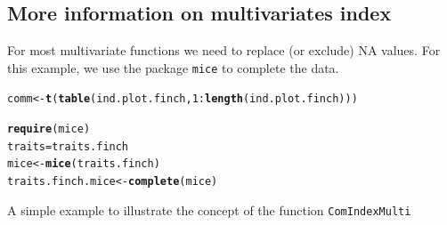 \documentclass[12pt]{article}\usepackage[]{graphicx}\usepackage[]{color}
\makeatletter
\newcommand{\hlnum}[1]{\textcolor[rgb]{0.686,0.059,0.569}{#1}}%
\newcommand{\hlopt}[1]{\textcolor[rgb]{0,0,0}{#1}}%
\newcommand{\hlstd}[1]{\textcolor[rgb]{0.345,0.345,0.345}{#1}}%
\newcommand{\hlkwb}[1]{\textcolor[rgb]{0.69,0.353,0.396}{#1}}%
\newcommand{\hlkwd}[1]{\textcolor[rgb]{0.737,0.353,0.396}{\textbf{#1}}}%
\newenvironment{kframe}{%
 \def\at@end@of@kframe{}%
 \ifinner\ifhmode%
  \def\at@end@of@kframe{\end{minipage}}%
  \begin{minipage}{\columnwidth}%
 \fi\fi%
 \def\FrameCommand##1{\hskip\@totalleftmargin \hskip-\fboxsep
 \colorbox{shadecolor}{##1}\hskip-\fboxsep
     \hskip-\linewidth \hskip-\@totalleftmargin \hskip\columnwidth}%
 \MakeFramed {\advance\hsize-\width
   \@totalleftmargin\z@ \linewidth\hsize
   \@setminipage}}%
 {\par\unskip\endMakeFramed%
 \at@end@of@kframe}
\newenvironment{knitrout}{}{} %
\makeatother
\begin{document}
\newpage

\subsection{More information on multivariates index}

For most multivariate functions we need to replace (or exclude) NA values. For this example, we use the package \texttt{mice} to complete the data.

\begin{knitrout}
\color{fgcolor}\begin{kframe}
\begin{alltt}
\hlstd{comm}\hlkwb{<-}\hlkwd{t}\hlstd{(}\hlkwd{table}\hlstd{(ind.plot.finch,}\hlnum{1}\hlopt{:}\hlkwd{length}\hlstd{(ind.plot.finch)))}

\hlkwd{require}\hlstd{(mice)}
\hlstd{traits} \hlkwb{=} \hlstd{traits.finch}
\hlstd{mice}\hlkwb{<-}\hlkwd{mice}\hlstd{(traits.finch)}
\hlstd{traits.finch.mice}\hlkwb{<-}\hlkwd{complete}\hlstd{(mice)}
\end{alltt}
\end{kframe}
\end{knitrout}

A simple example to illustrate the concept of the function \texttt{ComIndexMulti}
\end{document}
